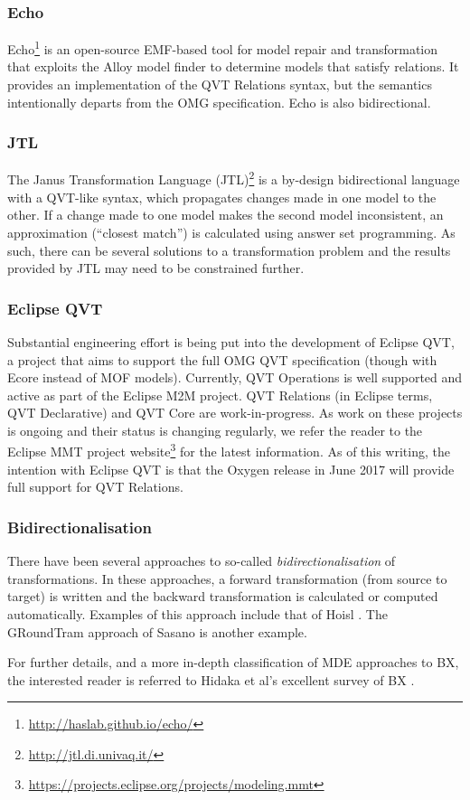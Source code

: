 \subsubsection{Echo}
Echo\footnote{\url{http://haslab.github.io/echo/}} is an open-source EMF-based tool for model repair and transformation that exploits the Alloy model finder to determine models that satisfy relations. It provides an implementation of the QVT Relations syntax, but the semantics intentionally departs from the OMG specification. Echo is also bidirectional.

\subsubsection{JTL}
The Janus Transformation Language (JTL)\footnote{\url{http://jtl.di.univaq.it/}} is a by-design bidirectional language with a QVT-like syntax, which propagates changes made in one model to the other. If a change made to one model makes the second model inconsistent, an approximation (``closest match'') is calculated using answer set programming. As such, there can be several solutions to a transformation problem and the results provided by JTL may need to be constrained further.

\subsubsection{Eclipse QVT}
Substantial engineering effort is being put into the development of Eclipse QVT, a project that
aims to support the full OMG QVT specification (though with Ecore instead of MOF models). Currently, QVT Operations is well supported and active as part of the Eclipse M2M project. QVT Relations (in Eclipse terms, QVT Declarative) and QVT Core are work-in-progress. As work on these projects is ongoing and their status is changing regularly, we refer the reader to the Eclipse MMT project website\footnote{\url{https://projects.eclipse.org/projects/modeling.mmt}} for the latest information. As of this writing, the intention with Eclipse QVT is that the Oxygen release in June 2017 will provide full support for QVT Relations.

\subsubsection{Bidirectionalisation}
There have been several approaches to so-called \textit{bidirectionalisation} of transformations. In these approaches, a forward transformation (from source to target) is written and the backward transformation is calculated or computed automatically. Examples of this approach include that of Hoisl \cite{HoislHH14a}. The GRoundTram approach of Sasano \cite{SasanoHHIKN11} is another example.

\vspace{4mm}

For further details, and a more in-depth classification of MDE approaches to BX, the interested reader is referred to Hidaka et al's excellent survey of BX \cite{HidakaTCH16}.



